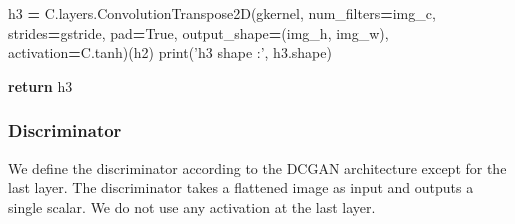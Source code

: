 \documentclass[]{book}
\newenvironment{Shaded}{\begin{snugshade}}{\end{snugshade}}
\newcommand{\StringTok}[1]{\textcolor[rgb]{0.31,0.60,0.02}{#1}}
\newcommand{\VariableTok}[1]{\textcolor[rgb]{0.00,0.00,0.00}{#1}}
\newcommand{\ControlFlowTok}[1]{\textcolor[rgb]{0.13,0.29,0.53}{\textbf{#1}}}
\newcommand{\OperatorTok}[1]{\textcolor[rgb]{0.81,0.36,0.00}{\textbf{#1}}}
\newcommand{\BuiltInTok}[1]{#1}
\newcommand{\NormalTok}[1]{#1}
\theoremstyle{definition}
\theoremstyle{definition}
\theoremstyle{definition}
\theoremstyle{remark}
\begin{document}
\begin{Shaded}
\begin{Highlighting}[]
\NormalTok{        h3 }\OperatorTok{=}\NormalTok{ C.layers.ConvolutionTranspose2D(gkernel,}
\NormalTok{                                  num_filters}\OperatorTok{=}\NormalTok{img_c,}
\NormalTok{                                  strides}\OperatorTok{=}\NormalTok{gstride,}
\NormalTok{                                  pad}\OperatorTok{=}\VariableTok{True}\NormalTok{,}
\NormalTok{                                  output_shape}\OperatorTok{=}\NormalTok{(img_h, img_w),}
\NormalTok{                                  activation}\OperatorTok{=}\NormalTok{C.tanh)(h2)}
        \BuiltInTok{print}\NormalTok{(}\StringTok{'h3 shape :'}\NormalTok{, h3.shape)}

        \ControlFlowTok{return}\NormalTok{ h3}
\end{Highlighting}
\end{Shaded}

\subsubsection{Discriminator}\label{discriminator}

We define the discriminator according to the DCGAN architecture except
for the last layer. The discriminator takes a flattened image as input
and outputs a single scalar. We do not use any activation at the last
layer.
\end{document}
